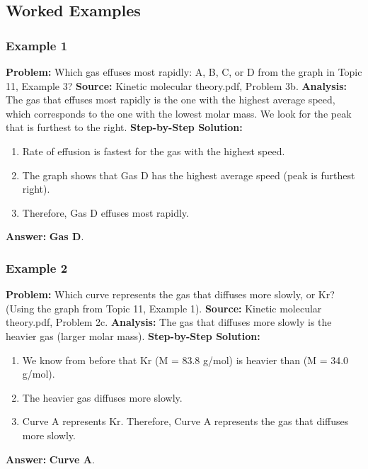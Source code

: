 \documentclass{article}
\begin{document}
\subsection{Worked Examples}
\subsubsection{Example 1}
\textbf{Problem:} Which gas effuses most rapidly: A, B, C, or D from the graph in Topic 11, Example 3?
\textbf{Source:} Kinetic molecular theory.pdf, Problem 3b.
\textbf{Analysis:} The gas that effuses most rapidly is the one with the highest average speed, which corresponds to the one with the lowest molar mass. We look for the peak that is furthest to the right.
\textbf{Step-by-Step Solution:}
\begin{enumerate}
    \item Rate of effusion is fastest for the gas with the highest speed.
    \item The graph shows that Gas D has the highest average speed (peak is furthest right).
    \item Therefore, Gas D effuses most rapidly.
\end{enumerate}
\textbf{Answer:} \textbf{Gas D}.

\subsubsection{Example 2}
\textbf{Problem:} Which curve represents the gas that diffuses more slowly,  or Kr? (Using the graph from Topic 11, Example 1).
\textbf{Source:} Kinetic molecular theory.pdf, Problem 2c.
\textbf{Analysis:} The gas that diffuses more slowly is the heavier gas (larger molar mass).
\textbf{Step-by-Step Solution:}
\begin{enumerate}
    \item We know from before that Kr (M = 83.8 g/mol) is heavier than  (M = 34.0 g/mol).
    \item The heavier gas diffuses more slowly.
    \item Curve A represents Kr. Therefore, Curve A represents the gas that diffuses more slowly.
\end{enumerate}
\textbf{Answer:} \textbf{Curve A}.
\end{document}
